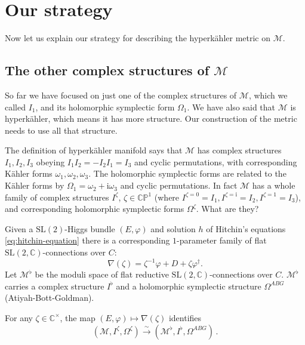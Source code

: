 \documentclass[12pt,letterpaper,reqno]{article}
\numberwithin{equation}{section}
\begin{document}
\section{Our strategy}

Now let us explain our strategy for describing the hyperk\"ahler metric on $\mathcal M$.

\subsection{The other complex structures of \texorpdfstring{$\mathcal M$}{M}}

So far we have focused on just one of the complex
structures of $\mathcal M$, which we called $I_1$,
and its holomorphic symplectic form $\Omega_1$.
We have also said that $\mathcal M$ is hyperk\"ahler, which means it has more structure.
Our construction of the metric needs to use all that structure.

The definition of hyperk\"ahler manifold says that 
$\mathcal M$ has complex structures $I_1, I_2, I_3$ obeying
$I_1 I_2 = -I_2 I_1 = I_3$ and cyclic permutations,
with corresponding K\"ahler forms $\omega_1, \omega_2, \omega_3$.
The holomorphic symplectic forms are related to the
K\"ahler forms by $\Omega_1 = \omega_2 + \mathrm i \omega_3$ 
and cyclic permutations.
In fact $\mathcal M$ has a whole family of complex structures 
$I^\zeta$, $\zeta \in \mathbb C\mathbb P^1$ (where
$I^{\zeta=0} = I_1, I^{\zeta = \mathrm i} = I_2, I^{\zeta = 1} = I_3$),
and corresponding holomorphic symplectic forms $\Omega^\zeta$.
What are they?

Given a $\mathrm{SL}(2)$-Higgs bundle $(E,\varphi)$ and 
solution $h$ of Hitchin's equations \eqref{eq:hitchin-equation}
there is a corresponding $1$-parameter family of flat
$\mathrm{SL}(2,\mathbb C)$-connections over $C$:
\begin{equation}
  \nabla(\zeta) = \zeta^{-1} \varphi + D + \zeta \varphi^\dagger.
\end{equation}
Let $\mathcal M^\flat$
be the moduli space of flat reductive 
$\mathrm{SL}(2,\mathbb C)$-connections over $C$. 
$\mathcal M^\flat$ carries a complex structure $I^\flat$
and a holomorphic symplectic
structure $\Omega^{ABG}$ (Atiyah-Bott-Goldman).

\begin{prop} \label{prop:generic-structures-flat-connections} For any $\zeta \in \mathbb C^\times$,
the map $(E,\varphi) \mapsto \nabla(\zeta)$ identifies
\begin{equation}
  (\mathcal M, I^\zeta, \Omega^\zeta) \xrightarrow\sim (\mathcal M^\flat, I^\flat, \Omega^{ABG}) \, .
\end{equation}
\end{prop}
\end{document}
